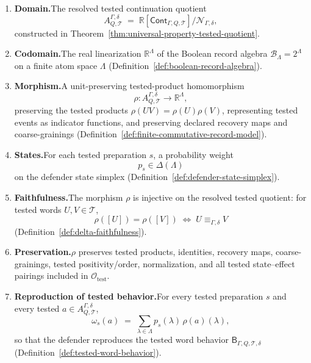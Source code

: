 \documentclass[11pt]{article}
\newcommand{\Cont}{\mathsf{Cont}}
\newcommand{\R}{\mathbb R}
\begin{document}
\begin{enumerate}[label=(\arabic*),leftmargin=2em]
\item \textbf{Domain.}\quad The resolved tested continuation
quotient
\[
    A^{\Gamma,\delta}_{Q,\mathcal T}
    \;=\;
    \R[\Cont_{\Gamma,Q,\mathcal T}]/\mathcal N_{\Gamma,\delta},
\]
constructed in
Theorem~\ref{thm:universal-property-tested-quotient}.

\item \textbf{Codomain.}\quad The real linearization
$\R^\Lambda$ of the Boolean record algebra
$\mathcal B_\Lambda = 2^\Lambda$ on a finite atom space
$\Lambda$ (Definition~\ref{def:boolean-record-algebra}).

\item \textbf{Morphism.}\quad A unit-preserving tested-product
homomorphism
\[
    \rho:A^{\Gamma,\delta}_{Q,\mathcal T}\to\R^\Lambda,
\]
preserving the tested products $\rho(UV)=\rho(U)\rho(V)$,
representing tested events as indicator functions, and preserving
declared recovery maps and coarse-grainings
(Definition~\ref{def:finite-commutative-record-model}).

\item \textbf{States.}\quad For each tested preparation $s$, a
probability weight
\[
    p_s\in\Delta(\Lambda)
\]
on the defender state simplex
(Definition~\ref{def:defender-state-simplex}).

\item \textbf{Faithfulness.}\quad The morphism $\rho$ is injective
on the resolved tested quotient: for tested words
$U,V\in\mathcal T$,
\[
    \rho([U])=\rho([V])
    \;\Longleftrightarrow\;
    U\equiv_{\Gamma,\delta}V
\]
(Definition~\ref{def:delta-faithfulness}).

\item \textbf{Preservation.}\quad $\rho$ preserves tested products,
identities, recovery maps, coarse-grainings, tested
positivity/order, normalization, and all tested state--effect
pairings included in $\mathcal O_{\mathrm{test}}$.

\item \textbf{Reproduction of tested behavior.}\quad For every
tested preparation $s$ and every tested
$a\in A^{\Gamma,\delta}_{Q,\mathcal T}$,
\[
    \omega_s(a)
    \;=\;
    \sum_{\lambda\in\Lambda} p_s(\lambda)\,\rho(a)(\lambda),
\]
so that the defender reproduces the tested word behavior
$\mathsf B_{\Gamma,Q,\mathcal T,\delta}$
(Definition~\ref{def:tested-word-behavior}).
\end{enumerate}
\end{document}

